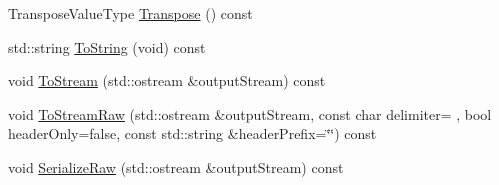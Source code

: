 \begin{DoxyCompactItemize}
Transpose\+Value\+Type \hyperlink{classvct_fixed_size_const_matrix_base_aeae4dddb96b8264169d4aea8ca0479e9}{Transpose} () const 
\item 
std\+::string \hyperlink{classvct_fixed_size_const_matrix_base_adf8dc513147101677b5572201dbb8c4f}{To\+String} (void) const 
\item 
void \hyperlink{classvct_fixed_size_const_matrix_base_a709aa22c92cb589b3bfc75b1fb3eee57}{To\+Stream} (std\+::ostream \&output\+Stream) const 
\item 
void \hyperlink{classvct_fixed_size_const_matrix_base_a615c4bd393d0ff9c177deb3152420862}{To\+Stream\+Raw} (std\+::ostream \&output\+Stream, const char delimiter= \textquotesingle{} \textquotesingle{}, bool header\+Only=false, const std\+::string \&header\+Prefix=\char`\"{}\char`\"{}) const 
\item 
void \hyperlink{classvct_fixed_size_const_matrix_base_a5c91f548566ba05c2e257499dfdb456c}{Serialize\+Raw} (std\+::ostream \&output\+Stream) const 
\end{DoxyCompactItemize}
